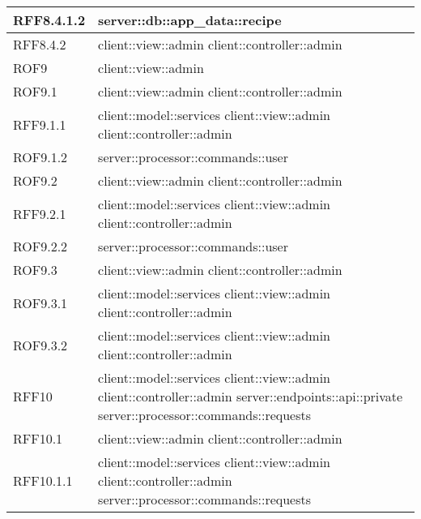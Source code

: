\begin{center}
\begin{longtable}{| p{4cm} | p{8cm} |}
\hline
RFF8.4.1.2 & server::db::app\_data::recipe \\
\hline
RFF8.4.2 & client::view::admin \newline client::controller::admin \\
\hline
ROF9 & client::view::admin \\
\hline
ROF9.1 & client::view::admin \newline client::controller::admin \\
\hline
RFF9.1.1 & client::model::services \newline client::view::admin \newline client::controller::admin \\
\hline
ROF9.1.2 & server::processor::commands::user \\
\hline
ROF9.2 & client::view::admin \newline client::controller::admin \\
\hline
RFF9.2.1 & client::model::services \newline client::view::admin \newline client::controller::admin \\
\hline
ROF9.2.2 & server::processor::commands::user \\
\hline
ROF9.3 & client::view::admin \newline client::controller::admin \\
\hline
ROF9.3.1 & client::model::services \newline client::view::admin \newline client::controller::admin \\
\hline
ROF9.3.2 & client::model::services \newline client::view::admin \newline client::controller::admin \\
\hline
RFF10 & client::model::services \newline client::view::admin \newline client::controller::admin \newline server::endpoints::api::private \newline server::processor::commands::requests \\
\hline
RFF10.1 & client::view::admin \newline client::controller::admin \\
\hline
RFF10.1.1 & client::model::services \newline client::view::admin \newline client::controller::admin \newline server::processor::commands::requests \\

\end{longtable}
\end{center}

